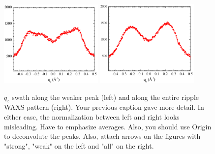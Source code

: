 \begin{figure}[htbp]
  \centering
  \includegraphics[width=0.45\textwidth]{figures/ripple/tWAXS/twaxs_weak_qz}
  \includegraphics[width=0.45\textwidth]{figures/ripple/tWAXS/twaxs_both_qz}
  \caption{$q_z$ swath along the weaker peak (left) and 
  along the entire ripple WAXS pattern (right). {\jn Your previous caption gave more detail.  In either case, the normalization between left and right looks misleading.  Have to emphasize averages.  Also, you should use Origin to deconvolute the peaks.  Also, attach arrows on the figures with "strong", "weak" on the left and "all" on the right.}}
  \label{fig:twaxs_qzplot}
\end{figure}  


